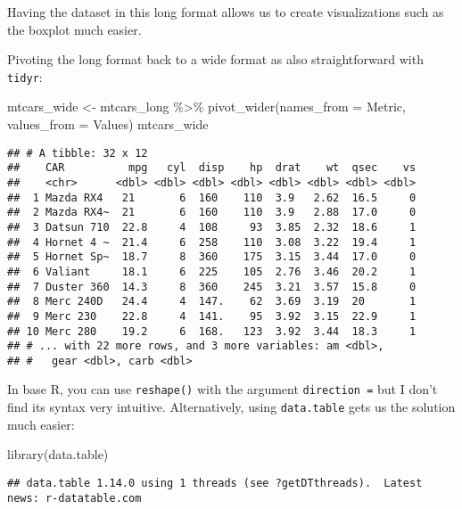 \documentclass[
]{book}
\newenvironment{Shaded}{\begin{snugshade}}{\end{snugshade}}
\newcommand{\AttributeTok}[1]{\textcolor[rgb]{0.77,0.63,0.00}{#1}}
\newcommand{\FunctionTok}[1]{\textcolor[rgb]{0.00,0.00,0.00}{#1}}
\newcommand{\NormalTok}[1]{#1}
\newcommand{\OtherTok}[1]{\textcolor[rgb]{0.56,0.35,0.01}{#1}}
\newcommand{\SpecialCharTok}[1]{\textcolor[rgb]{0.00,0.00,0.00}{#1}}
\newcommand{\StringTok}[1]{\textcolor[rgb]{0.31,0.60,0.02}{#1}}
\begin{document}
Having the dataset in this long format allows us to create visualizations such as the boxplot much easier.

Pivoting the long format back to a wide format as also straightforward with \texttt{tidyr}:

\begin{Shaded}
\begin{Highlighting}[]
\NormalTok{mtcars\_wide }\OtherTok{\textless{}{-}}\NormalTok{ mtcars\_long }\SpecialCharTok{\%\textgreater{}\%} 
  \FunctionTok{pivot\_wider}\NormalTok{(}\AttributeTok{names\_from =} \StringTok{\textquotesingle{}Metric\textquotesingle{}}\NormalTok{, }\AttributeTok{values\_from =} \StringTok{\textquotesingle{}Values\textquotesingle{}}\NormalTok{)}
\NormalTok{mtcars\_wide}
\end{Highlighting}
\end{Shaded}

\begin{verbatim}
## # A tibble: 32 x 12
##    CAR          mpg   cyl  disp    hp  drat    wt  qsec    vs
##    <chr>      <dbl> <dbl> <dbl> <dbl> <dbl> <dbl> <dbl> <dbl>
##  1 Mazda RX4   21       6  160    110  3.9   2.62  16.5     0
##  2 Mazda RX4~  21       6  160    110  3.9   2.88  17.0     0
##  3 Datsun 710  22.8     4  108     93  3.85  2.32  18.6     1
##  4 Hornet 4 ~  21.4     6  258    110  3.08  3.22  19.4     1
##  5 Hornet Sp~  18.7     8  360    175  3.15  3.44  17.0     0
##  6 Valiant     18.1     6  225    105  2.76  3.46  20.2     1
##  7 Duster 360  14.3     8  360    245  3.21  3.57  15.8     0
##  8 Merc 240D   24.4     4  147.    62  3.69  3.19  20       1
##  9 Merc 230    22.8     4  141.    95  3.92  3.15  22.9     1
## 10 Merc 280    19.2     6  168.   123  3.92  3.44  18.3     1
## # ... with 22 more rows, and 3 more variables: am <dbl>,
## #   gear <dbl>, carb <dbl>
\end{verbatim}

In base R, you can use \texttt{reshape()} with the argument \texttt{direction\ =} but I don't find its syntax very intuitive. Alternatively, using \texttt{data.table} gets us the solution much easier:

\begin{Shaded}
\begin{Highlighting}[]
\FunctionTok{library}\NormalTok{(data.table)}
\end{Highlighting}
\end{Shaded}

\begin{verbatim}
## data.table 1.14.0 using 1 threads (see ?getDTthreads).  Latest news: r-datatable.com
\end{verbatim}
\end{document}
